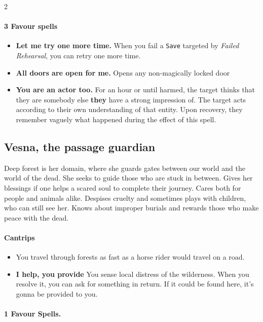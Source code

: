 \documentclass{osr-template/zine}
\begin{document}
\begin{multicols*}{2}
\paragraph{3 Favour spells}
\begin{itemize}[nosep]
    \item[\ding{108}] \textbf{Let me try one more time.} When you fail a \texttt{Save} targeted by \textit{Failed Rehearsal}, you can retry one more time.
    \item[\ding{108}] \textbf{All doors are open for me.} Opens any non-magically locked door
    \item[\ding{108}] \textbf{You are an actor too.} For an hour or until harmed, the target thinks that they are somebody else \textbf{they} have a strong impression of.
 The target acts according to their own understanding of that entity.
 Upon recovery, they remember vaguely what happened during the effect of this spell.
\end{itemize}

\newpage



\subsection*{Vesna, the passage guardian}

Deep forest is her domain, where she guards gates between our world and the world of the dead.
She seeks to guide those who are stuck in between.
Gives her blessings if one helps a scared soul to complete their journey.
Cares both for people and animals alike.
Despises cruelty and sometimes plays with children, who can still see her.
Knows about improper burials and rewards those who make peace with the dead.


\paragraph{Cantrips}
\begin{itemize}[nosep]
    \item[\ding{108}] You travel through forests as fast as a horse rider would travel on a road.
    \item[\ding{108}] \textbf{I help, you provide} You sense local distress of the wilderness.
 When you resolve it, you can ask for something in return.
 If it could be found here, it's gonna be provided to you.
\end{itemize}

\paragraph{1 Favour Spells.}


\end{multicols*}
\end{document}
